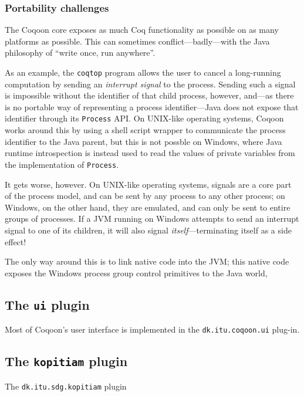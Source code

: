 \documentclass{article}
\newcommand{\fdef}[1]{\textit{#1}}
\begin{document}
\subsubsection{Portability challenges}

The Coqoon core exposes as much Coq functionality as possible on as many
platforms as possible. This can sometimes conflict---badly---with the Java
philosophy of ``write once, run anywhere''.

As an example, the \texttt{coqtop} program allows the user to cancel a
long-running computation by sending an \fdef{interrupt signal} to the process.
Sending such a signal is impossible without the identifier of that child
process, however, and---as there is no portable way of representing a process
identifier---Java does not expose that identifier through its \texttt{Process}
API. On UNIX-like operating systems, Coqoon works around this by using a shell
script wrapper to communicate the process identifier to the Java parent, but
this is not possble on Windows, where Java runtime introspection is instead
used to read the values of private variables from the implementation of
\texttt{Process}.

It gets worse, however. On UNIX-like operating systems, signals are a core part
of the process model, and can be sent by any process to any other process; on
Windows, on the other hand, they are emulated, and can only be sent to entire
groups of processes. If a JVM running on Windows attempts to send an interrupt
signal to one of its children, it will also signal \emph{itself}---terminating
itself as a side effect!

The only way around this is to link native code into the JVM; this native code
exposes the Windows process group control primitives to the Java world, 

\subsection{The \texttt{ui} plugin}

Most of Coqoon's user interface is implemented in the
\texttt{dk.itu.coqoon.ui} plug-in.

\subsection{The \texttt{kopitiam} plugin}

The \texttt{dk.itu.sdg.kopitiam} plugin
\end{document}
